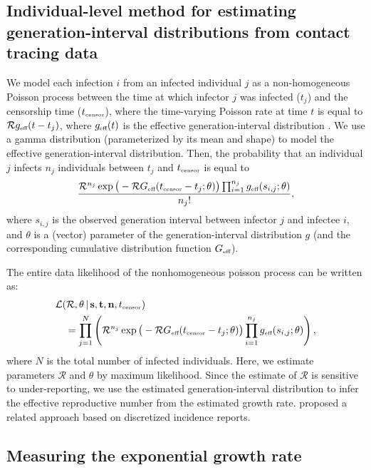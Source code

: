 \documentclass[12pt]{article}
\newcommand{\RR}{\ensuremath{{\mathcal R}}}
\newcommand{\tsub}[2]{#1_{{\textrm{\tiny #2}}}}
\begin{document}
\subsection{Individual-level method for estimating generation-interval distributions from contact tracing data}

We model each infection $i$ from an infected individual $j$ as a non-homogeneous Poisson process between the time at which infector $j$ was infected ($t_j$) and the censorship time ($\tsub{t}{censor}$), where the time-varying Poisson rate at time $t$ is equal to $\RR \tsub{g}{eff}(t - t_j)$, where $\tsub{g}{eff}(t)$ is the effective generation-interval distribution \citep{daley2007introduction}.
We use a gamma distribution (parameterized by its mean and shape) to model the effective generation-interval distribution.
Then, the probability that an individual $j$ infects $n_j$ individuals between $t_j$ and $\tsub{t}{censor}$ is equal to
\begin{equation}
\frac{\RR^{n_j} \exp \big(- \RR \tsub{G}{eff}(\tsub{t}{censor} - t_j ;\theta) \big) \prod_{i=1}^{n_j} \tsub{g}{eff}(s_{i, j}; \theta)}{n_j!},
\end{equation}
where $s_{i,j}$ is the observed generation interval between infector $j$ and infectee $i$, and $\theta$ is a (vector) parameter of the generation-interval distribution $g$ (and the corresponding cumulative distribution function $\tsub{G}{eff}$).

The entire data likelihood of the nonhomogeneous poisson process can be written as:
\begin{equation}
\begin{aligned}
&\mathcal{L}(\RR, \theta\,|\, \mathbf{s}, \mathbf{t}, \mathbf{n}, \tsub{t}{censor})\\
&\quad=\prod_{j=1}^N \left(\RR^{n_j} \exp \big(- \RR \tsub{G}{eff}(\tsub{t}{censor} - t_j ;\theta) \big) \prod_{i=1}^{n_j} \tsub{g}{eff}(s_{i, j}; \theta) \right),
\end{aligned}
\end{equation}
where $N$ is the total number of infected individuals.
Here, we estimate parameters $\RR$ and $\theta$ by maximum likelihood.
Since the estimate of $\RR$ is sensitive to under-reporting, we use the estimated generation-interval distribution to infer the effective reproductive number from the estimated growth rate.
\cite{forsberg2008likelihood} proposed a related approach based on discretized incidence reports.

\subsection{Measuring the exponential growth rate}
\end{document}
